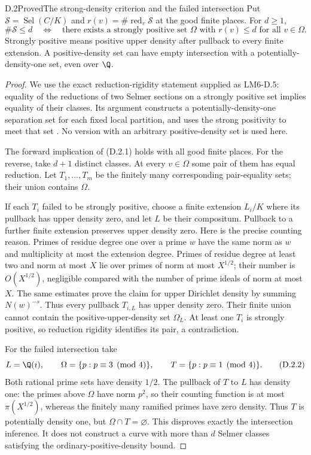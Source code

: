 \begin{statement}{D.2}{Proved}{The strong-density criterion and the failed intersection}
Put $\mathcal S=\operatorname{Sel}(C/K)$ and
$r(v)=\#\operatorname{red}_v\mathcal S$ at the good finite places.
For $d\geq1$,
\[
 \#\mathcal S\leq d
 \quad\Longleftrightarrow\quad
 \text{there exists a strongly positive set $\Omega$ with
 $r(v)\leq d$ for all $v\in\Omega$}.
 \tag{D.2.1}
\]
Strongly positive means positive upper density after pullback to
every finite extension. A positive-density set can have empty
intersection with a potentially-density-one set, even over $\Q$.
\end{statement}
\begin{proof}
We use the exact reduction-rigidity statement supplied as
LM6-D.5: equality of the reductions of two Selmer sections on a
strongly positive set implies equality of their classes. Its
argument constructs a potentially-density-one separation set for
each fixed local partition, and uses the strong positivity to
meet that set \cite[D.5]{AgentLM6}. No version with an arbitrary
positive-density set is used here.

The forward implication of (D.2.1) holds with all good finite
places. For the reverse, take $d+1$ distinct classes. At every
$v\in\Omega$ some pair of them has equal reduction. Let
$T_1,\ldots,T_m$ be the finitely many corresponding pair-equality
sets; their union contains $\Omega$.

If each $T_i$ failed to be strongly positive, choose a finite
extension $L_i/K$ where its pullback has upper density zero, and
let $L$ be their compositum. Pullback to a further finite
extension preserves upper density zero. Here is the precise
counting reason. Primes of residue degree one over a prime $w$
have the same norm as $w$ and multiplicity at most the extension
degree. Primes of residue degree at least two and norm at most
$X$ lie over primes of norm at most $X^{1/2}$; their number is
$O(X^{1/2})$, negligible compared with the number of prime
ideals of norm at most $X$. The same estimates prove the claim
for upper Dirichlet density by summing $N(w)^{-s}$.
Thus every pullback $T_{i,L}$ has upper density zero. Their
finite union cannot contain the positive-upper-density set
$\Omega_L$. At least one $T_i$ is strongly positive, so reduction
rigidity identifies its pair, a contradiction.

For the failed intersection take
\[
 L=\Q(i),\qquad
 \Omega=\{p:p\equiv3\pmod4\},\qquad
 T=\{p:p\equiv1\pmod4\}.
 \tag{D.2.2}
\]
Both rational prime sets have density $1/2$. The pullback of
$T$ to $L$ has density one: the primes above $\Omega$ have norm
$p^2$, so their counting function is at most
$\pi(X^{1/2})$, whereas the finitely many ramified primes have
zero density. Thus $T$ is potentially density one, but
$\Omega\cap T=\varnothing$. This disproves exactly the
intersection inference. It does not construct a curve with more
than $d$ Selmer classes satisfying the ordinary-positive-density
bound.
\end{proof}

